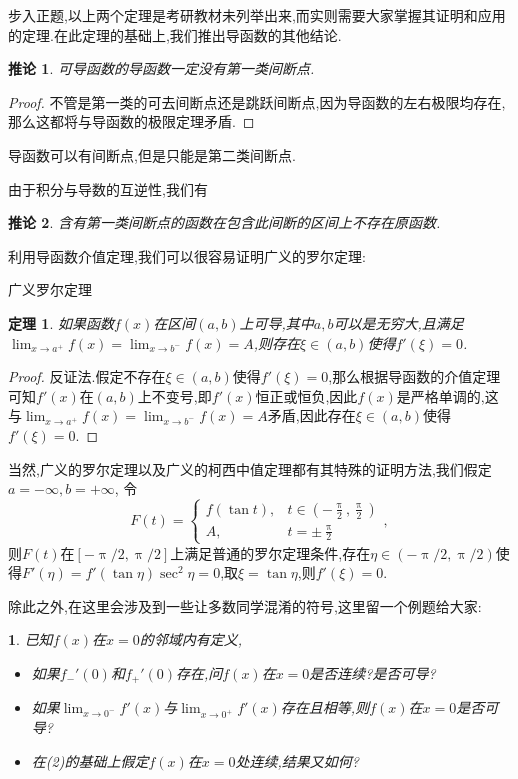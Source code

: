 \documentclass[UTF8,no-math,12pt,openany,table,dvipsnames,svgnames]{book}
\renewcommand{\pi}{\uppi}
\newtheorem{theorem}{定理}
\newtheorem{cor}{推论}
\newtheorem{example}{}
\newenvironment{note}{\par\CJKfamily{note}\noindent{\makebox[0pt][r]{\scriptsize\color{red!90}
\textdbend\quad}\textbf{注:}}}{\par}
\begin{document}
步入正题,以上两个定理是考研教材未列举出来,而实则需要大家掌握其证明和应用的定理.在此定理的基础上,我们推出导函数的其他结论.
\begin{cor}
可导函数的导函数一定没有第一类间断点.
\end{cor}
\begin{proof}
不管是第一类的可去间断点还是跳跃间断点,因为导函数的左右极限均存在,那么这都将与导函数的极限定理矛盾.
\end{proof}
\begin{note}
导函数可以有间断点,但是只能是第二类间断点.
\end{note}
由于积分与导数的互逆性,我们有
\begin{cor}
含有第一类间断点的函数在包含此间断的区间上不存在原函数.
\end{cor}
利用导函数介值定理,我们可以很容易证明广义的罗尔定理:
\begin{MYBOX}[colbacktitle=red]{广义罗尔定理}
\begin{theorem}
如果函数$f(x)$在区间$(a,b)$上可导,其中$a,b$可以是无穷大,且满足$\lim_{x\to a^+}f(x)=\lim_{x\to b^-}f(x)=A$,则存在$\xi\in(a,b)$使得$f'(\xi)=0$.
\end{theorem}
\tcblower
\begin{proof}
反证法.假定不存在$\xi\in(a,b)$使得$f'(\xi)=0$,那么根据导函数的介值定理可知$f'(x)$在$(a,b)$上不变号,即$f'(x)$恒正或恒负,因此$f(x)$是严格单调的,这与$\lim_{x\to a^+}f(x)=\lim_{x\to b^-}f(x)=A$矛盾,因此存在$\xi\in(a,b)$使得$f'(\xi)=0$.
\end{proof}
\hspace{2em}当然,广义的罗尔定理以及广义的柯西中值定理都有其特殊的证明方法,我们假定$a=-\infty,b=+\infty$, 令
\[F(t)=\begin{cases}
f\left(\tan t\right),&t\in\left(-\frac\pi2,\frac\pi2\right)\\
A,&t=\pm\frac\pi2
\end{cases},\]
则$F(t)$在$[-\pi/2,\pi/2]$上满足普通的罗尔定理条件,存在$\eta\in(-\pi/2,\pi/2)$使得$F'(\eta)=f'(\tan\eta)\sec^2\eta=0$,取$\xi=\tan\eta$,则$f'(\xi)=0$.
\end{MYBOX}
除此之外,在这里会涉及到一些让多数同学混淆的符号,这里留一个例题给大家:
\begin{example}
已知$f(x)$在$x=0$的邻域内有定义,
\begin{itemize}
  \item[(1)]如果$f_-'(0)$和$f_+'(0)$存在,问$f(x)$在$x=0$是否连续?是否可导?
  \item[(2)]如果$\lim_{x\to0^-}f'(x)$与$\lim_{x\to 0^+}f'(x)$存在且相等,则$f(x)$在$x=0$是否可导?
  \item[(3)]在(2)的基础上假定$f(x)$在$x=0$处连续,结果又如何?
\end{itemize}

\end{example}
\end{document}

